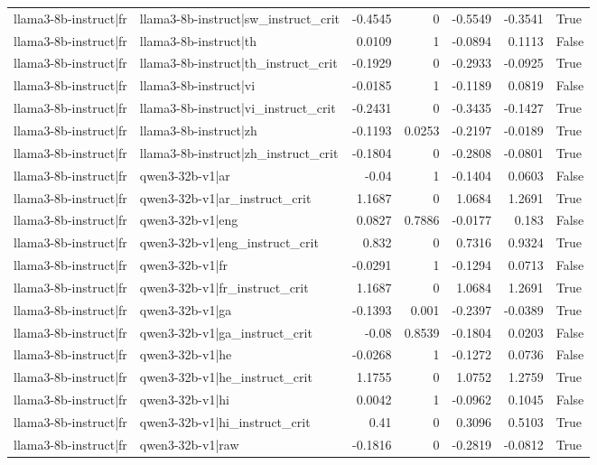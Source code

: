 \begin{table}
\begin{tabular}{l l r r r r l}
llama3-8b-instruct|fr & llama3-8b-instruct|sw_instruct_crit & -0.4545 & 0 & -0.5549 & -0.3541 & True \\
llama3-8b-instruct|fr & llama3-8b-instruct|th & 0.0109 & 1 & -0.0894 & 0.1113 & False \\
llama3-8b-instruct|fr & llama3-8b-instruct|th_instruct_crit & -0.1929 & 0 & -0.2933 & -0.0925 & True \\
llama3-8b-instruct|fr & llama3-8b-instruct|vi & -0.0185 & 1 & -0.1189 & 0.0819 & False \\
llama3-8b-instruct|fr & llama3-8b-instruct|vi_instruct_crit & -0.2431 & 0 & -0.3435 & -0.1427 & True \\
llama3-8b-instruct|fr & llama3-8b-instruct|zh & -0.1193 & 0.0253 & -0.2197 & -0.0189 & True \\
llama3-8b-instruct|fr & llama3-8b-instruct|zh_instruct_crit & -0.1804 & 0 & -0.2808 & -0.0801 & True \\
llama3-8b-instruct|fr & qwen3-32b-v1|ar & -0.04 & 1 & -0.1404 & 0.0603 & False \\
llama3-8b-instruct|fr & qwen3-32b-v1|ar_instruct_crit & 1.1687 & 0 & 1.0684 & 1.2691 & True \\
llama3-8b-instruct|fr & qwen3-32b-v1|eng & 0.0827 & 0.7886 & -0.0177 & 0.183 & False \\
llama3-8b-instruct|fr & qwen3-32b-v1|eng_instruct_crit & 0.832 & 0 & 0.7316 & 0.9324 & True \\
llama3-8b-instruct|fr & qwen3-32b-v1|fr & -0.0291 & 1 & -0.1294 & 0.0713 & False \\
llama3-8b-instruct|fr & qwen3-32b-v1|fr_instruct_crit & 1.1687 & 0 & 1.0684 & 1.2691 & True \\
llama3-8b-instruct|fr & qwen3-32b-v1|ga & -0.1393 & 0.001 & -0.2397 & -0.0389 & True \\
llama3-8b-instruct|fr & qwen3-32b-v1|ga_instruct_crit & -0.08 & 0.8539 & -0.1804 & 0.0203 & False \\
llama3-8b-instruct|fr & qwen3-32b-v1|he & -0.0268 & 1 & -0.1272 & 0.0736 & False \\
llama3-8b-instruct|fr & qwen3-32b-v1|he_instruct_crit & 1.1755 & 0 & 1.0752 & 1.2759 & True \\
llama3-8b-instruct|fr & qwen3-32b-v1|hi & 0.0042 & 1 & -0.0962 & 0.1045 & False \\
llama3-8b-instruct|fr & qwen3-32b-v1|hi_instruct_crit & 0.41 & 0 & 0.3096 & 0.5103 & True \\
llama3-8b-instruct|fr & qwen3-32b-v1|raw & -0.1816 & 0 & -0.2819 & -0.0812 & True \\

\end{tabular}
\end{table}
